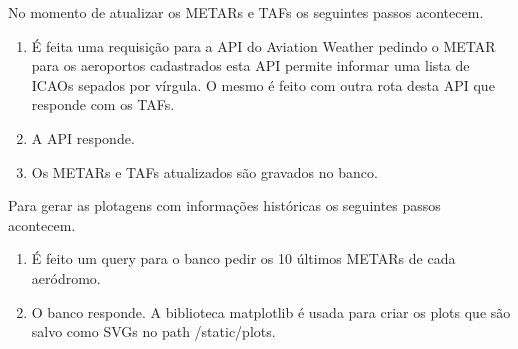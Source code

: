 No momento de atualizar os METARs e TAFs os seguintes passos acontecem.

\begin{enumerate}
\item É feita uma requisição para a API do Aviation Weather pedindo o METAR para os aeroportos
cadastrados esta API permite informar uma lista de ICAOs sepados por vírgula.
O mesmo é feito com outra rota desta API que responde com os TAFs.
\item A API responde.
\item Os METARs e TAFs atualizados são gravados no banco.
\end{enumerate}

Para gerar as plotagens com informações históricas os seguintes passos acontecem.
\begin{enumerate}
    \item É feito um query para o banco pedir os 10 últimos METARs de cada aeródromo.
    \item O banco responde. A biblioteca matplotlib é usada para criar os plots que são salvo como SVGs 
    no path /static/plots.
\end{enumerate}